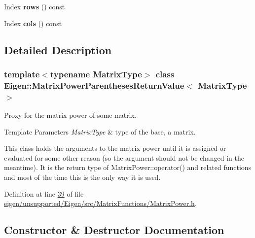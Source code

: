 \begin{DoxyCompactItemize}
\mbox{\label{class_eigen_1_1_matrix_power_parentheses_return_value_a3d4c222d1ac986d5634d48e7c4c063ba}} 
Index {\bfseries rows} () const
\item 
\mbox{\label{class_eigen_1_1_matrix_power_parentheses_return_value_aa28962cac15946c4855f8155aa55c371}} 
Index {\bfseries cols} () const
\end{DoxyCompactItemize}


\subsection{Detailed Description}
\subsubsection*{template$<$typename Matrix\+Type$>$\newline
class Eigen\+::\+Matrix\+Power\+Parentheses\+Return\+Value$<$ Matrix\+Type $>$}

Proxy for the matrix power of some matrix. 


\begin{DoxyTemplParams}{Template Parameters}
{\em Matrix\+Type} & type of the base, a matrix.\\
\hline
\end{DoxyTemplParams}
This class holds the arguments to the matrix power until it is assigned or evaluated for some other reason (so the argument should not be changed in the meantime). It is the return type of Matrix\+Power\+::operator() and related functions and most of the time this is the only way it is used. 

Definition at line \hyperlink{eigen_2unsupported_2_eigen_2src_2_matrix_functions_2_matrix_power_8h_source_l00039}{39} of file \hyperlink{eigen_2unsupported_2_eigen_2src_2_matrix_functions_2_matrix_power_8h_source}{eigen/unsupported/\+Eigen/src/\+Matrix\+Functions/\+Matrix\+Power.\+h}.



\subsection{Constructor \& Destructor Documentation}
\mbox{\label{class_eigen_1_1_matrix_power_parentheses_return_value_ae3a02d943a31427a6dc8c1f60f3367d7}} 
